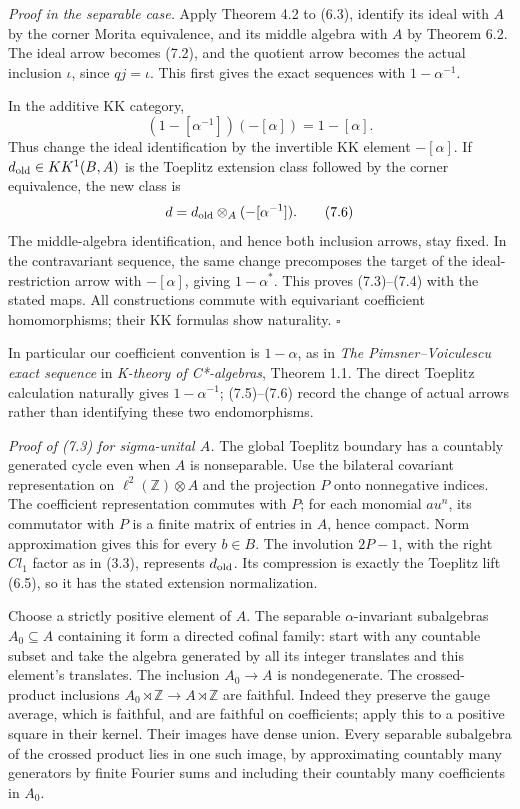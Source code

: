 \documentclass[
  11pt,
]{article}
\begin{document}
\emph{Proof in the separable case.} Apply Theorem 4.2 to (6.3), identify
its ideal with \(A\) by the corner Morita equivalence, and its middle
algebra with \(A\) by Theorem 6.2. The ideal arrow becomes (7.2), and
the quotient arrow becomes the actual inclusion \(\iota\), since
\(qj=\iota\). This first gives the exact sequences with
\(1-\alpha^{-1}\).

In the additive KK category, \[
(1-[\alpha^{-1}])(-[\alpha])=1-[\alpha].
\tag{7.5}
\] Thus change the ideal identification by the invertible KK element
\(-[\alpha]\). If \(d_{\rm old}\in KK^1(B,A)\) is the Toeplitz extension
class followed by the corner equivalence, the new class is \[
d=d_{\rm old}\otimes_A(-[\alpha^{-1}]).
\tag{7.6}
\] The middle-algebra identification, and hence both inclusion arrows,
stay fixed. In the contravariant sequence, the same change precomposes
the target of the ideal-restriction arrow with \(-[\alpha]\), giving
\(1-\alpha^*\). This proves (7.3)--(7.4) with the stated maps. All
constructions commute with equivariant coefficient homomorphisms; their
KK formulas show naturality. \(\square\)

In particular our coefficient convention is \(1-\alpha\), as in
\emph{The Pimsner--Voiculescu exact sequence} in \emph{K-theory of
C*-algebras}, Theorem 1.1. The direct Toeplitz calculation naturally
gives \(1-\alpha^{-1}\); (7.5)--(7.6) record the change of actual arrows
rather than identifying these two endomorphisms.

\emph{Proof of (7.3) for sigma-unital \(A\).} The global Toeplitz
boundary has a countably generated cycle even when \(A\) is
nonseparable. Use the bilateral covariant representation on
\(\ell^2(\mathbb Z)\otimes A\) and the projection \(P\) onto nonnegative
indices. The coefficient representation commutes with \(P\); for each
monomial \(au^n\), its commutator with \(P\) is a finite matrix of
entries in \(A\), hence compact. Norm approximation gives this for every
\(b\in B\). The involution \(2P-1\), with the right \(Cl_1\) factor as
in (3.3), represents \(d_{\rm old}\). Its compression is exactly the
Toeplitz lift (6.5), so it has the stated extension normalization.

Choose a strictly positive element of \(A\). The separable
\(\alpha\)-invariant subalgebras \(A_0\subseteq A\) containing it form a
directed cofinal family: start with any countable subset and take the
algebra generated by all its integer translates and this element's
translates. The inclusion \(A_0\to A\) is nondegenerate. The
crossed-product inclusions \(A_0\rtimes\mathbb Z\to A\rtimes\mathbb Z\)
are faithful. Indeed they preserve the gauge average, which is faithful,
and are faithful on coefficients; apply this to a positive square in
their kernel. Their images have dense union. Every separable subalgebra
of the crossed product lies in one such image, by approximating
countably many generators by finite Fourier sums and including their
countably many coefficients in \(A_0\).
\end{document}
